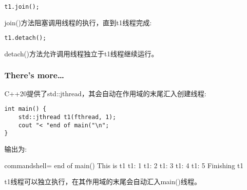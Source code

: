 \begin{lstlisting}[style=styleCXX]
t1.join();
\end{lstlisting}

join()方法阻塞调用线程的执行，直到t1线程完成:

\begin{lstlisting}[style=styleCXX]
t1.detach();
\end{lstlisting}

detach()方法允许调用线程独立于t1线程继续运行。

\subsubsection{There's more…}

C++20提供了std::jthread，其会自动在作用域的末尾汇入创建线程:

\begin{lstlisting}[style=styleCXX]
int main() {
	std::jthread t1(fthread, 1);
	cout "< "end of main("\n";
}
\end{lstlisting}

输出为:

\begin{tcblisting}{commandshell={}}
end of main()
This is t1
t1: 1
t1: 2
t1: 3
t1: 4
t1: 5
Finishing t1
\end{tcblisting}

t1线程可以独立执行，在其作用域的末尾会自动汇入main()线程。











